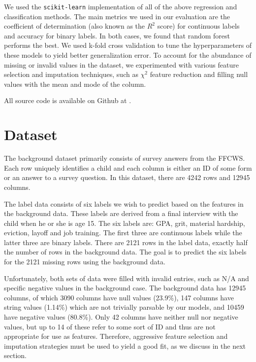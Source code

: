 \documentclass{article} %
\begin{document}
We used the \texttt{scikit-learn} \cite{scikitlearn} implementation of all of the above regression and classification methods. The main metrics we used in our evaluation are the coefficient of determination (also known as the $R^2$ score) for continuous labels and accuracy for binary labels. In both cases, we found that random forest performs the best. We used k-fold cross validation to tune the hyperparameters of these models to yield better generalization error. To account for the abundance of missing or invalid values in the dataset, we experimented with various feature selection and imputation techniques, such as $\chi^2$ feature reduction and filling null values with the mean and mode of the column.

All source code is available on Github at \cite{myrepo}.

\section{Dataset}
\label{sec:dataset}

The background dataset primarily consists of survey answers from the FFCWS. Each row uniquely identifies a child and each column is either an ID of some form or an answer to a survey question. In this dataset, there are 4242 rows and 12945 columns.

The label data consists of six labels we wish to predict based on the features in the background data. These labels are derived from a final interview with the child when he or she is age 15. The six labels are: GPA, grit, material hardship, eviction, layoff and job training. The first three are continuous labels while the latter three are binary labels. There are 2121 rows in the label data, exactly half the number of rows in the background data. The goal is to predict the six labels for the 2121 missing rows using the background data.

Unfortunately, both sets of data were filled with invalid entries, such as N/A and specific negative values in the background case. The background data has 12945 columns, of which 3090 columns have null values (23.9\%), 147 columns have string values (1.14\%) which are not trivially parsable by our models, and 10459 have negative values (80.8\%). Only 42 columns have neither null nor negative values, but up to 14 of these refer to some sort of ID and thus are not appropriate for use as features. Therefore, aggressive feature selection and imputation strategies must be used to yield a good fit, as we discuss in the next section. 
\end{document}
